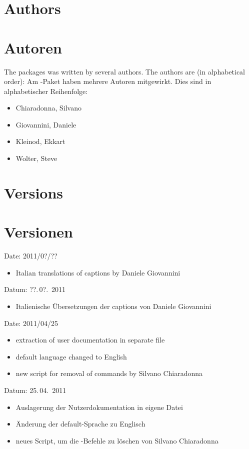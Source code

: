 	\section{Authors}
\fi
	\ifGERMAN
		\section{Autoren}
	\fi
\label{sec:authors}

\ifENGLISH
	The  packages was written by several authors.
	The authors are (in alphabetical order):
\fi
	\ifGERMAN
		Am -Paket haben mehrere Autoren mitgewirkt.
		Dies sind in alphabetischer Reihenfolge:
	\fi
\begin{itemize}
	\item Chiaradonna, Silvano
	\item Giovannini, Daniele
	\item Kleinod, Ekkart
	\item Wolter, Steve
\end{itemize}

\ifENGLISH
	\section{Versions}
\fi
	\ifGERMAN
		\section{Versionen}
	\fi
\label{sec:versions}


\ifENGLISH
	Date: 2011/0?/??
	\begin{itemize}
		\item Italian translations of captions by Daniele Giovannini
	\end{itemize}
\fi
	\ifGERMAN
		Datum: ??.\,0?.~2011
		\begin{itemize}
			\item Italienische Übersetzungen der captions von Daniele Giovannini
		\end{itemize}
	\fi


\ifENGLISH
	Date: 2011/04/25
	\begin{itemize}
		\item extraction of user documentation in separate file
		\item default language changed to English
		\item new script for removal of  commands by Silvano Chiaradonna
	\end{itemize}
\fi
	\ifGERMAN
		Datum: 25.\,04.~2011
		\begin{itemize}
			\item Auslagerung der Nutzerdokumentation in eigene Datei
			\item Änderung der default-Sprache zu Englisch
			\item neues Script, um die -Befehle zu löschen von Silvano Chiaradonna
		\end{itemize}
	\fi

